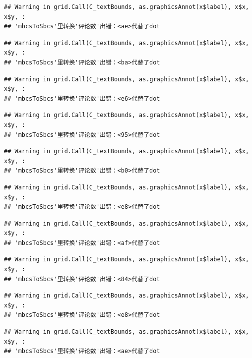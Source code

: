 \documentclass[
]{article}
\begin{document}
\begin{verbatim}
## Warning in grid.Call(C_textBounds, as.graphicsAnnot(x$label), x$x, x$y, :
## 'mbcsToSbcs'里转换'评论数'出错：<ae>代替了dot
\end{verbatim}

\begin{verbatim}
## Warning in grid.Call(C_textBounds, as.graphicsAnnot(x$label), x$x, x$y, :
## 'mbcsToSbcs'里转换'评论数'出错：<ba>代替了dot
\end{verbatim}

\begin{verbatim}
## Warning in grid.Call(C_textBounds, as.graphicsAnnot(x$label), x$x, x$y, :
## 'mbcsToSbcs'里转换'评论数'出错：<e6>代替了dot
\end{verbatim}

\begin{verbatim}
## Warning in grid.Call(C_textBounds, as.graphicsAnnot(x$label), x$x, x$y, :
## 'mbcsToSbcs'里转换'评论数'出错：<95>代替了dot
\end{verbatim}

\begin{verbatim}
## Warning in grid.Call(C_textBounds, as.graphicsAnnot(x$label), x$x, x$y, :
## 'mbcsToSbcs'里转换'评论数'出错：<b0>代替了dot
\end{verbatim}

\begin{verbatim}
## Warning in grid.Call(C_textBounds, as.graphicsAnnot(x$label), x$x, x$y, :
## 'mbcsToSbcs'里转换'评论数'出错：<e8>代替了dot
\end{verbatim}

\begin{verbatim}
## Warning in grid.Call(C_textBounds, as.graphicsAnnot(x$label), x$x, x$y, :
## 'mbcsToSbcs'里转换'评论数'出错：<af>代替了dot
\end{verbatim}

\begin{verbatim}
## Warning in grid.Call(C_textBounds, as.graphicsAnnot(x$label), x$x, x$y, :
## 'mbcsToSbcs'里转换'评论数'出错：<84>代替了dot
\end{verbatim}

\begin{verbatim}
## Warning in grid.Call(C_textBounds, as.graphicsAnnot(x$label), x$x, x$y, :
## 'mbcsToSbcs'里转换'评论数'出错：<e8>代替了dot
\end{verbatim}

\begin{verbatim}
## Warning in grid.Call(C_textBounds, as.graphicsAnnot(x$label), x$x, x$y, :
## 'mbcsToSbcs'里转换'评论数'出错：<ae>代替了dot
\end{verbatim}
\end{document}
